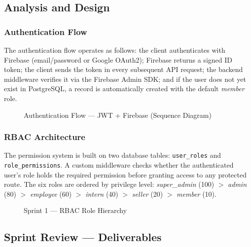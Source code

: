\subsection{Analysis and Design}

\subsubsection{Authentication Flow}

The authentication flow operates as follows: the client authenticates with Firebase (email/password or Google OAuth2); Firebase returns a signed ID token; the client sends the token in every subsequent API request; the backend middleware verifies it via the Firebase Admin SDK; and if the user does not yet exist in PostgreSQL, a record is automatically created with the default \textit{member} role.

\begin{figure}[H]
\centering
\resizebox{\textwidth}{!}{}
\caption{Authentication Flow --- JWT + Firebase (Sequence Diagram)}
\label{fig:sprint1_auth_flow}
\end{figure}

\subsubsection{RBAC Architecture}

The permission system is built on two database tables: \texttt{user\_roles} and \texttt{role\_permissions}. A custom middleware checks whether the authenticated user's role holds the required permission before granting access to any protected route. The six roles are ordered by privilege level: \textit{super\_admin} (100) $>$ \textit{admin} (80) $>$ \textit{employee} (60) $>$ \textit{intern} (40) $>$ \textit{seller} (20) $>$ \textit{member} (10).

\begin{figure}[H]
\centering
\resizebox{0.9\textwidth}{!}{}
\caption{Sprint 1 --- RBAC Role Hierarchy}
\label{fig:sprint1_rbac}
\end{figure}

\subsection{Sprint Review --- Deliverables}

